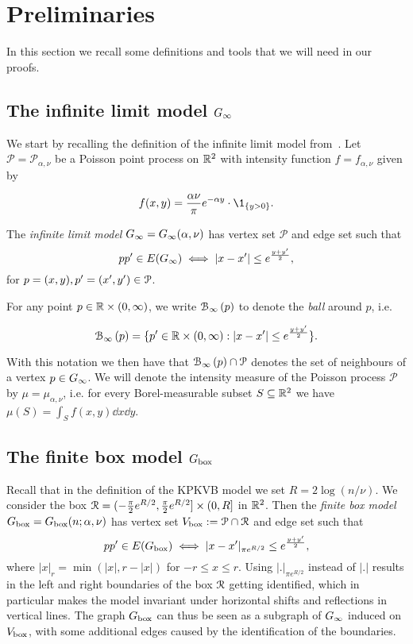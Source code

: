 
\section{Preliminaries\label{sec:proof_outline}}

In this section we recall some definitions and tools that we will need in our proofs.

\subsection{The infinite limit model $G_{\infty}$\label{ssec:infinite_model}}

We start by recalling the definition of the infinite limit model from~\cite{fountoulakis2018law}.
Let $\mathcal{P}=\mathcal{P}_{\alpha,\nu}$ be a Poisson point process on ${\mathbb R}^2$ with intensity function $f=f_{\alpha,\nu}$ given by

\begin{equation}\label{eq:def_intensity_function_f}
	f(x,y) = \frac{\alpha \nu}{\pi} e^{-\alpha y} \cdot \1_{\{y>0\}}.
\end{equation} 

The \emph{infinite limit model} $G_{\infty} = G_{\infty}(\alpha,\nu)$ has vertex set $\mathcal{P}$ and edge set such that
\[
	pp' \in E(G_{\infty}) \iff |x - x'| \leq e^{\frac{y + y'}{2}},
\]
for $p=(x,y),p'=(x',y')\in{\mathcal P}$.

For any point $p \in {\ensuremath{\mathbb R}} \times (0,\infty)$, we write ${\mathcal B}_{\infty}\left(p\right)$ to denote the \emph{ball} around $p$, i.e.

\begin{equation}\label{eq:def_ball_P}
	{\mathcal B}_{\infty}\left(p\right) = \{p^\prime \in {\mathbb R}\times(0,\infty) : |x - x^\prime| \leq e^{\frac{y + y^\prime}{2}}\}.
\end{equation}

With this notation we then have that ${\mathcal B}_{\infty}\left(p\right) \cap {\mathcal P}$ denotes the set of neighbours of a vertex $p \in G_{\infty}$.
We will denote the intensity measure of the Poisson process $\mathcal{P}$ by $\mu = \mu_{\alpha, \nu}$, i.e. for every 
Borel-measurable subset $S \subseteq {\mathbb R}^2$ we have $\mu(S) = \int_S f(x,y) \dd x \dd y$.


\subsection{The finite box model $G_{\mathrm{box}}$\label{ssec:finite_model}}


Recall that in the definition of the KPKVB model we set $R = 2\log(n/\nu)$.
We consider the box ${\mathcal R} = (-\frac{\pi}{2}e^{R/2}, \frac{\pi}{2}e^{R/2}] \times (0, R]$ in ${\mathbb R}^2$. 
Then the \emph{finite box model} $G_{\mathrm{box}} = G_{\mathrm{box}}(n;\alpha, \nu)$ has vertex set $V_{\text{box}} := \mathcal{P} \cap {\mathcal R}$ and edge set such that
\[
	pp' \in E(G_{\mathrm{box}}) \iff |x - x'|_{\pi e^{R/2}} \leq e^{\frac{y + y'}{2}},
\]
where $|x|_{r} = \min( |x|, r - |x|)$ for $-r\leq x\leq r$. Using $|.|_{\pi e^{R/2}}$ instead of $|.|$ results in the left and right boundaries of the box ${\mathcal R}$ getting identified, which in particular makes the model invariant under horizontal shifts and reflections in vertical lines. 
The graph $G_{\mathrm{box}}$ can thus be seen as a subgraph of $G_{\infty}$ induced on $V_{\text{box}}$, with some additional edges caused by the identification of the boundaries.

